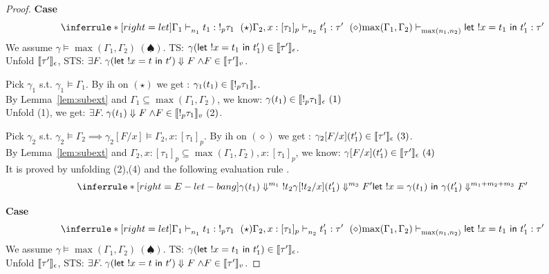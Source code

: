 \documentclass{article}
\begin{document}
\begin{proof}
 
  \noindent \textbf{Case} 
  \[
    \inferrule*[ right = let ]
   {\Gamma_1 \jtype{n_1}{}{t_1}{!_p \tau_1}~(\star) \\ \Gamma_2, x: [\tau_1]_p \jtype{n_2}{}{t_1'}{\tau'}~(\diamond)}
   { \max(\Gamma_1,\Gamma_2) \jtype{\max(n_1,n_2)}{}{\letx{!x}{t_1}{t_1'}}{\tau'}  }
  \]
  We assume $\gamma \vDash \max(\Gamma_1,\Gamma_2 ) ~(\spadesuit) $.
  TS: $ \gamma ( \mathrel{ \mathsf{let}\ {!x} = {t_1} \ \mathsf{in} \ {t_1'} } ) \in \llbracket { \tau'} \rrbracket_{\epsilon} $. \\
  Unfold $ \llbracket { \tau'} \rrbracket_{\epsilon} $, STS: $\exists F. \mathrel{ {\gamma ( \mathrel{ \mathsf{let}\ {!x} = {t} \ \mathsf{in} \ {t'} } )} \Downarrow^{} {F} } \land F \in \llbracket { \tau'} \rrbracket_{v} $.
  
  Pick $\gamma_1$ s.t. $\gamma_1 \vDash \Gamma_1 $. By ih on $(\star)$ we get : $ \gamma_1(t_1) \in \llbracket {!_p \tau_1 } \rrbracket_{\epsilon}$. \\
  By Lemma~\ref{lem:subext} and $\Gamma_1 \subseteq \max(\Gamma_1,\Gamma_2)$, we know: $ \gamma(t_1) \in \llbracket {!_p \tau_1 } \rrbracket_{\epsilon}~(1) $\\
  Unfold (1), we get: $\exists F. \mathrel{ {\gamma(t_1)} \Downarrow^{} {F} } \land F \in \llbracket { !_p \tau_1} \rrbracket_{v}~(2)  $.  
 
  Pick $\gamma_2$ s.t. $\gamma_2 \vDash \Gamma_2 \implies \gamma_2[F/x] \vDash \Gamma_2, x:[\tau_1]_p $. By ih on $(\diamond)$ we get : $ \gamma_2[F/x](t_1') \in \llbracket { \tau' } \rrbracket_{\epsilon} ~(3)$. \\
  By Lemma~\ref{lem:subext} and $\Gamma_2, x:[\tau_1]_p \subseteq \max(\Gamma_1,\Gamma_2), x:[\tau_1]_p$, we know: $ \gamma[F/x](t_1') \in \llbracket { \tau' } \rrbracket_{\epsilon}~(4) $\\
  

    It is proved by unfolding (2),(4) and the following evaluation rule .
   \[
   \inferrule*[ right=E-let-bang]
  {   
    { \eval{ \gamma(t_1) }{ !t_2  }{m_1} } 
    \\
    { \eval{\gamma[!t_2/x](t_1') }{ F'}{m_3 } }
  }
  { \eval{  \letx{!x}{\gamma(t_1)}{\gamma(t_1')}  }{ F'  }{ m_1+m_2+m_3  } }  
   \]
  
  \noindent \textbf{Case} 
  \[
    \inferrule*[ right = let ]
   {\Gamma_1 \jtype{n_1}{}{t_1}{!_p \tau_1}~(\star) \\ \Gamma_2, x: [\tau_1]_p \jtype{n_2}{}{t_1'}{\tau'}~(\diamond)}
   { \max(\Gamma_1,\Gamma_2) \jtype{\max(n_1,n_2)}{}{\letx{!x}{t_1}{t_1'}}{\tau'}  }
  \]
  We assume $\gamma \vDash \max(\Gamma_1,\Gamma_2 ) ~(\spadesuit) $.
  TS: $ \gamma ( \mathrel{ \mathsf{let}\ {!x} = {t_1} \ \mathsf{in} \ {t_1'} } ) \in \llbracket { \tau'} \rrbracket_{\epsilon} $. \\
  Unfold $ \llbracket { \tau'} \rrbracket_{\epsilon} $, STS: $\exists F. \mathrel{ {\gamma ( \mathrel{ \mathsf{let}\ {!x} = {t} \ \mathsf{in} \ {t'} } )} \Downarrow^{} {F} } \land F \in \llbracket { \tau'} \rrbracket_{v} $.
  

\end{proof}
\end{document}
